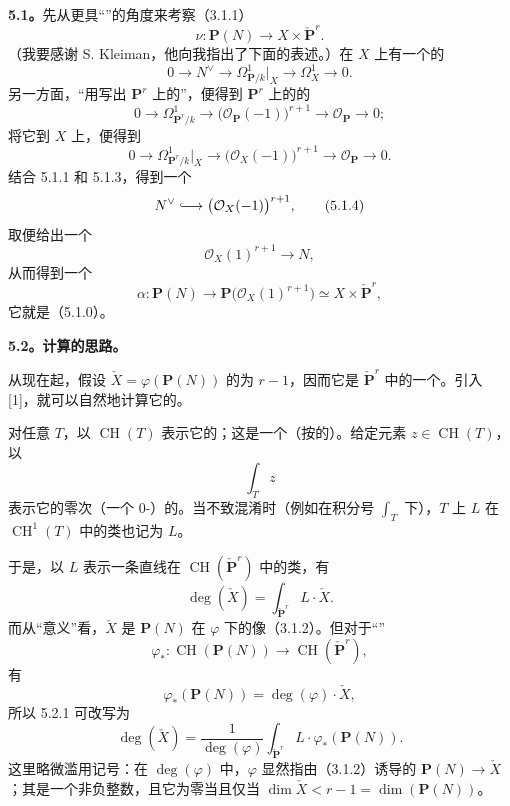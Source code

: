 \textbf{5.1。}先从更具“”的角度来考察（3.1.1）
\[
\nu:\mathbf P(N)\longrightarrow X\times\check{\mathbf P}^{r}.
\tag{5.1.0}
\]
（我要感谢 S. Kleiman，他向我指出了下面的表述。）在 $X$ 上有一个的
\[
0\longrightarrow N^\vee\longrightarrow
\Omega^1_{\mathbf P/k}|_X\longrightarrow\Omega^1_X\longrightarrow0.
\tag{5.1.1}
\]
另一方面，“用写出 $\mathbf P^r$ 上的”，便得到 $\mathbf P^r$ 上的的
\[
0\longrightarrow\Omega^1_{\mathbf P^r/k}
\longrightarrow\bigl(\mathcal O_{\mathbf P}(-1)\bigr)^{r+1}
\longrightarrow\mathcal O_{\mathbf P}\longrightarrow0;
\tag{5.1.2}
\]
将它到 $X$ 上，便得到
\[
0\longrightarrow\Omega^1_{\mathbf P^r/k}|_X
\longrightarrow\bigl(\mathcal O_X(-1)\bigr)^{r+1}
\longrightarrow\mathcal O_{\mathbf P}\longrightarrow0.
\tag{5.1.3}
\]
结合 5.1.1 和 5.1.3，得到一个
\[
N^\vee\lhook\joinrel\longrightarrow
\bigl(\mathcal O_X(-1)\bigr)^{r+1},
\tag{5.1.4}
\]
取便给出一个
\[
\mathcal O_X(1)^{r+1}\longrightarrow N,
\tag{5.1.5}
\]
从而得到一个
\[
\alpha:\mathbf P(N)\longrightarrow
\mathbf P\bigl(\mathcal O_X(1)^{r+1}\bigr)
\simeq X\times\check{\mathbf P}^{r},
\tag{5.1.6}
\]
它就是（5.1.0）。

\textbf{5.2。计算的思路。}

从现在起，假设 $\check X=\varphi(\mathbf P(N))$ 的为 $r-1$，因而它是 $\check{\mathbf P}^{r}$ 中的一个。引入 [1]，就可以自然地计算它的。

对任意 $T$，以 $\operatorname{CH}(T)$ 表示它的；这是一个（按的）。给定元素 $z\in\operatorname{CH}(T)$，以
\[
\int_T z
\]
表示它的零次（一个 $0$-）的。当不致混淆时（例如在积分号 $\int_T$ 下），$T$ 上 $L$ 在 $\operatorname{CH}^1(T)$ 中的类也记为 $L$。

于是，以 $L$ 表示一条直线在 $\operatorname{CH}(\check{\mathbf P}^{r})$ 中的类，有
\[
\deg(\check X)=\int_{\check{\mathbf P}^{r}}L\cdot\check X.
\tag{5.2.1}
\]
而从“意义”看，$\check X$ 是 $\mathbf P(N)$ 在 $\varphi$ 下的像（3.1.2）。但对于“”
\[
\varphi_*:\operatorname{CH}(\mathbf P(N))
\longrightarrow\operatorname{CH}(\check{\mathbf P}^{r}),
\]
有
\[
\varphi_*(\mathbf P(N))=\deg(\varphi)\cdot\check X,
\]
所以 5.2.1 可改写为
\[
\deg(\check X)=\frac1{\deg(\varphi)}
\int_{\check{\mathbf P}^{r}}L\cdot\varphi_*(\mathbf P(N)).
\tag{5.2.2}
\]
这里略微滥用记号：在 $\deg(\varphi)$ 中，$\varphi$ 显然指由（3.1.2）诱导的 $\mathbf P(N)\longrightarrow\check X$；其是一个非负整数，且它为零当且仅当 $\dim\check X<r-1=\dim(\mathbf P(N))$。

